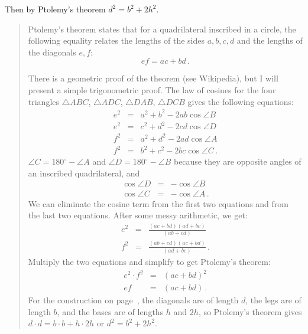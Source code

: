 \documentclass[11pt,a4paper]{article}
\begin{document}
Then by Ptolemy’s theorem $d^2 = b^2 + 2h^2$.
\begin{quote}
Ptolemy's theorem states that for a quadrilateral inscribed in a circle, the following equality relates the lengths of the sides $a,b,c,d$ and the lengths of the diagonals $e,f$:
\[
ef = ac + bd\,.
\]
\begin{center}
\end{center}
There is a geometric proof of the theorem (see Wikipedia), but I will present a simple trigonometric proof. The law of cosines for the four triangles $\triangle ABC$, $\triangle ADC$, $\triangle DAB$, $\triangle DCB$ gives the following equations:
\begin{eqnarray*}
e^2 &=& a^2 + b^2 - 2ab \cos \angle B\\
e^2 &=& c^2 + d^2 - 2cd \cos \angle D\\
f^2 &=& a^2 + d^2 - 2ad \cos \angle A\\
f^2 &=& b^2 + c^2 - 2bc \cos \angle C\,.
\end{eqnarray*}
$\angle C = 180^\circ - \angle A$ and $\angle D = 180^\circ - \angle B$ because they are opposite angles of an inscribed quadrilateral, and
\begin{eqnarray*}
\cos \angle D &=& - \cos \angle B\\
\cos \angle C &=& -\cos \angle A\,.
\end{eqnarray*}
We can eliminate the cosine term from the first two equations and from the last two equations. After some messy arithmetic, we get:
\begin{eqnarray*}
e^2 &=& \frac{(ac+bd)(ad+bc)}{(ab+cd)}\\
f^2 &=& \frac{(ab+cd)(ac+bd)}{(ad+bc)}\,.
\end{eqnarray*}
Multiply the two equations and simplify to get Ptolemy's theorem:
\begin{eqnarray*}
e^2\cdot f^2 &=& (ac+bd)^2\\
ef &=& (ac+bd)\,. 
\end{eqnarray*}
For the construction on page~\pageref{ptolemy}, the diagonals are of length $d$, the legs are of length $b$, and the bases are of lengths $h$ and $2h$, so Ptolemy's theorem gives $d\cdot d = b\cdot b + h\cdot 2h$ or $d^2=b^2+2h^2$.
\end{quote}
\end{document}
